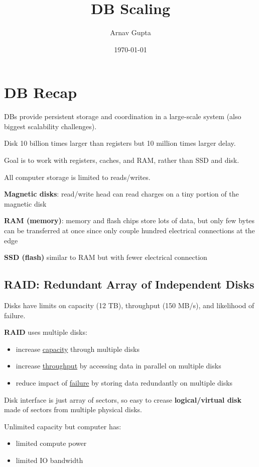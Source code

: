\documentclass[11pt]{article}
\author{Arnav Gupta}
\date{\today}
\title{DB Scaling}
\begin{document}
\maketitle
\tableofcontents

\section{DB Recap}
\label{sec:orgeeb01e7}
DBs provide persistent storage and coordination in a large-scale system (also biggest scalability
challenges).

Disk 10 billion times larger than registers but 10 million times larger delay.

Goal is to work with registers, caches, and RAM, rather than SSD and disk.

All computer storage is limited to reads/writes.

\textbf{Magnetic disks}: read/write head can read charges on a tiny portion of the magnetic disk

\textbf{RAM (memory)}: memory and flash chips store lots of data, but only few bytes can be transferred at once
since only couple hundred electrical connections at the edge

\textbf{SSD (flash)} similar to RAM but with fewer electrical connection
\subsection{RAID: Redundant Array of Independent Disks}
\label{sec:orgd352b4a}
Disks have limits on capacity (12 TB), throughput (150 MB/s), and likelihood of failure.

\textbf{RAID} uses multiple disks:
\begin{itemize}
\item increase \uline{capacity} through multiple disks
\item increase \uline{throughput} by accessing data in parallel on multiple disks
\item reduce impact of \uline{failure} by storing data redundantly on multiple disks
\end{itemize}

Disk interface is just array of sectors, so easy to crease \textbf{logical/virtual disk} made of sectors
from multiple physical disks.

Unlimited capacity but computer has:
\begin{itemize}
\item limited compute power
\item limited IO bandwidth
\end{itemize}
\end{document}

